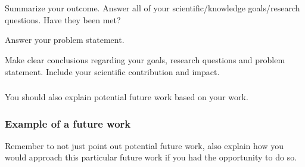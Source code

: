 \section{}\label{sec:conclusions}

Summarize your outcome. Answer all of your scientific/knowledge goals/research
questions. Have they been met?

Answer your problem statement.

Make clear conclusions regarding your goals, research questions and problem
statement. Include your scientific contribution and impact.

\subsubsection{}\label{subsec:future_work}
You should also explain potential future work based on your work.

\subsubsection{Example of a future work}\label{subsec:example_future_work}
Remember to not just point out potential future work, also explain how you would
approach this particular future work if you had the opportunity to do so.


